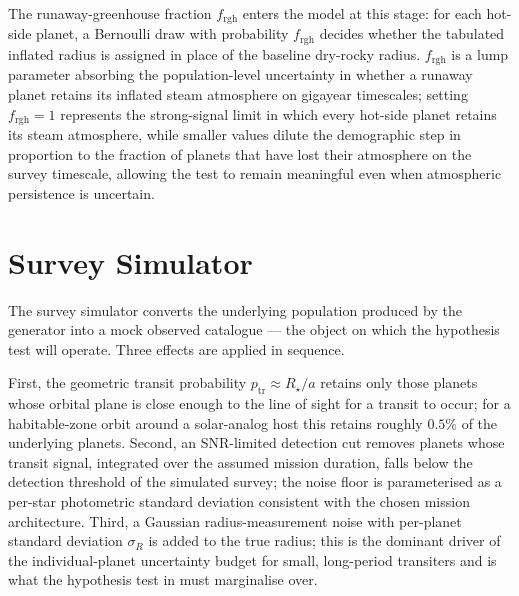 The runaway-greenhouse fraction $f_\mathrm{rgh}$ enters the model at
this stage: for each hot-side planet, a Bernoulli draw with
probability $f_\mathrm{rgh}$ decides whether the tabulated inflated
radius is assigned in place of the baseline dry-rocky radius.
$f_\mathrm{rgh}$ is a lump parameter absorbing the population-level
uncertainty in whether a runaway planet retains its inflated steam
atmosphere on gigayear timescales; setting $f_\mathrm{rgh}=1$
represents the strong-signal limit in which every hot-side planet
retains its steam atmosphere, while smaller values dilute the
demographic step in proportion to the fraction of planets that have
lost their atmosphere on the survey timescale, allowing the \HZIED
test to remain meaningful even when atmospheric persistence is
uncertain.


\label{sec:age_modelling}

\label{sec:composition_prior}


\section{Survey Simulator}
\label{sec:survey_simulator}

The survey simulator converts the underlying population produced by
the generator into a mock observed catalogue --- the object on which
the hypothesis test will operate.  Three effects are applied in
sequence.

First, the geometric transit probability
$p_{\mathrm{tr}} \approx R_\star / a$ retains only those planets whose
orbital plane is close enough to the line of sight for a transit to
occur; for a habitable-zone orbit around a solar-analog host this
retains roughly $0.5\%$ of the underlying planets.  Second, an
SNR-limited detection cut removes planets whose transit signal,
integrated over the assumed mission duration, falls below the
detection threshold of the simulated survey; the noise floor is
parameterised as a per-star photometric standard deviation
consistent with the chosen mission architecture.  Third, a Gaussian
radius-measurement noise with per-planet standard deviation
$\sigma_R$ is added to the true radius; this is the dominant driver
of the individual-planet uncertainty budget for small, long-period
transiters and is what the hypothesis test in
 must marginalise over.

